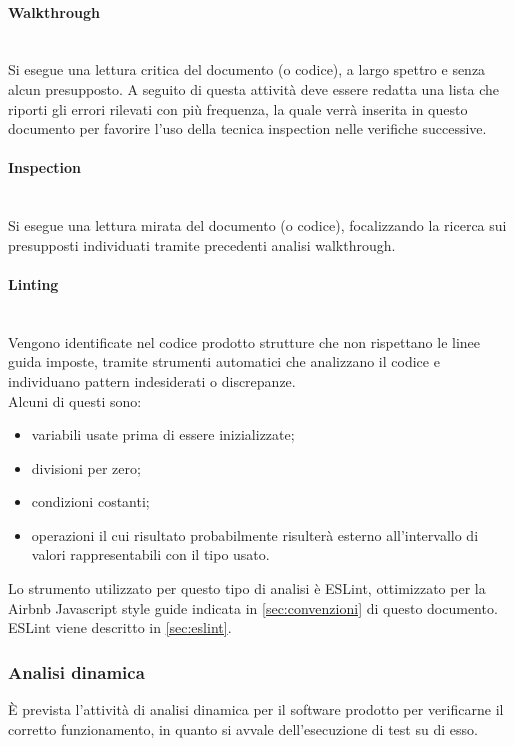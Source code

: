 \paragraph{Walkthrough} \mbox{}\\
Si esegue una lettura critica del documento (o codice), a largo spettro e senza alcun presupposto. A seguito di questa attività deve essere redatta una lista che riporti gli errori rilevati con più frequenza, la quale verrà inserita in questo documento per favorire l'uso della tecnica inspection nelle verifiche successive.

\paragraph{Inspection} \mbox{}\\
Si esegue una lettura mirata del documento (o codice), focalizzando la ricerca sui presupposti individuati tramite precedenti analisi walkthrough.

\paragraph{Linting}\mbox{}\\
Vengono identificate nel codice prodotto strutture che non rispettano le linee guida imposte, tramite strumenti automatici che analizzano il codice e individuano pattern indesiderati o discrepanze.\\
Alcuni di questi sono:\begin{itemize}
	\item variabili usate prima di essere inizializzate;  
	\item divisioni per zero;
	\item condizioni costanti;
	\item operazioni il cui risultato probabilmente risulterà esterno all'intervallo di valori rappresentabili con il tipo usato.
\end{itemize}
Lo strumento utilizzato per questo tipo di analisi è ESLint, ottimizzato per la Airbnb Javascript style guide indicata in \sezione\ref{sec:convenzioni} di questo documento. ESLint viene descritto in \sezione\ref{sec:eslint}.

\subsubsection{Analisi dinamica}
È prevista l’attività di analisi dinamica per il software prodotto per verificarne il corretto funzionamento, in quanto si avvale dell'esecuzione di test su di esso.
















